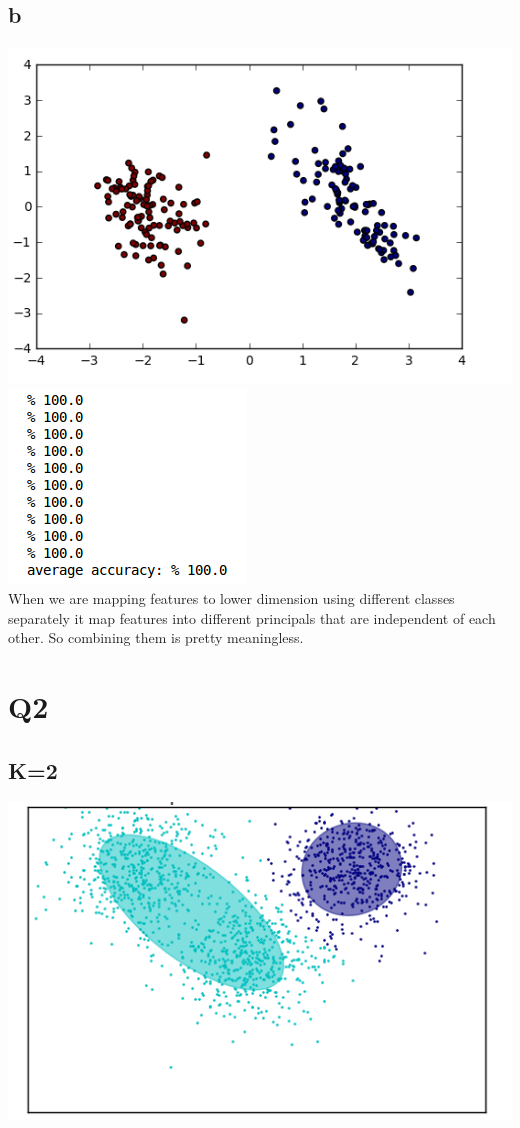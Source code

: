 \documentclass[11]{article}
\begin{document}
\subsection*{b}
\includegraphics[scale=0.75]{2.png} \\
\includegraphics[scale=0.75]{res2.png} \\
When we are mapping features to lower dimension using different classes separately it map features into different principals that are independent of each other. So combining them is pretty meaningless.
 

\section*{Q2}
\subsection*{K=2}
\includegraphics[scale=0.75]{3.png} \\
\end{document}
